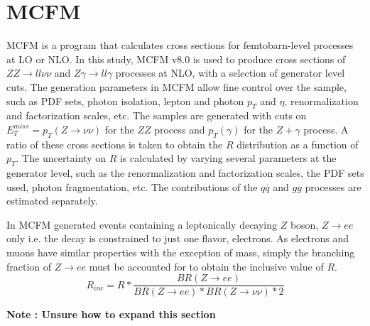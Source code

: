 \documentclass[11pt,a4paper,openright,twoside]{report}
\newcommand{\ZZ}{$ZZ\to ll\nu\nu$ }
\newcommand{\Zg}{$Z\gamma\to ll\gamma$ }
\begin{document}
\newpage
\section{MCFM}
MCFM is a program that calculates cross sections for femtobarn-level processes at LO or NLO. In this study, MCFM v8.0 \cite{MCFM} is used to produce cross sections of \ZZ and \Zg processes at NLO, with a selection of generator level cuts. The generation parameters in MCFM allow fine control over the sample, such as PDF sets, photon isolation, lepton and photon $p_T$ and $\eta$, renormalization and factorization scales, etc. The samples are generated with cuts on $E_T^{miss} = p_T(Z\to \nu\nu)$ for the $ZZ$ process and $p_T(\gamma)$ for the $Z+\gamma$ process. A ratio of these cross sections is taken to obtain the $R$ distribution as a function of $p_T$. The uncertainty on $R$ is calculated by varying several parameters at the generator level, such as the renormalization and factorization scales, the PDF sets used, photon fragmentation, etc. The contributions of the $q \bar{q}$ and $gg$ processes are estimated separately.

In MCFM generated events containing a leptonically decaying $Z$ boson, $Z\rightarrow ee$ only i.e. the decay is constrained to just one flavor, electrons. As electrons and muons have similar properties with the exception of mass, simply the branching fraction of $Z\rightarrow ee$ must be accounted for to obtain the inclusive value of $R$.
\begin{equation}\label{eq:R_inc}
	R_{inc} = R * \frac{BR(Z\rightarrow ee)}{BR(Z \rightarrow ee)*BR(Z\rightarrow \nu\nu)*2}
\end{equation}

\noindent\textbf{Note : Unsure how to expand this section}
\end{document}
